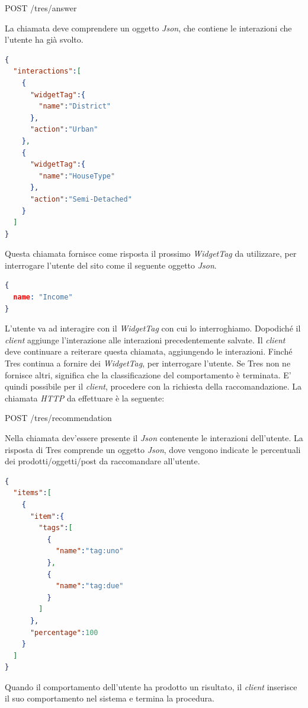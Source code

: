 \begin{center}
POST    /tres/answer
\end{center}
\newpage
La chiamata deve comprendere un oggetto \emph{Json}, che contiene le interazioni che l'utente ha già svolto.
\begin{lstlisting}[language=json,firstnumber=1]
{
  "interactions":[
    {
      "widgetTag":{
        "name":"District"
      },
      "action":"Urban"
    },
    {
      "widgetTag":{
        "name":"HouseType"
      },
      "action":"Semi-Detached"
    }  
  ]
}
\end{lstlisting}
Questa chiamata fornisce come risposta il prossimo \emph{WidgetTag} da utilizzare, per interrogare l'utente del sito come il seguente oggetto \emph{Json}.
\begin{lstlisting}[language=json,firstnumber=1]
{
  name: "Income"
}
\end{lstlisting}
L'utente va ad interagire con il \emph{WidgetTag} con cui lo interroghiamo. Dopodiché il \emph{client} aggiunge l'interazione alle interazioni precedentemente salvate. Il \emph{client} deve continuare a reiterare questa chiamata, aggiungendo le interazioni. Finché Tres continua a fornire dei \emph{WidgetTag}, per interrogare l'utente. Se Tres non ne fornisce altri, significa che la classificazione del comportamento è terminata. E' quindi possibile per il \emph{client}, procedere con la richiesta della raccomandazione. La chiamata \emph{HTTP} da effettuare è la seguente:
\begin{center}
POST    /tres/recommendation
\end{center}
Nella chiamata dev'essere presente il \emph{Json} contenente le interazioni dell'utente. La risposta di Tres comprende un oggetto \emph{Json}, dove vengono indicate le percentuali dei prodotti/oggetti/post da raccomandare all'utente.
\begin{lstlisting}[language=json,firstnumber=1]
{
  "items":[
    {
      "item":{
        "tags":[
          {
            "name":"tag:uno"
          },
          {
            "name":"tag:due"
          }
        ]
      },
      "percentage":100
    }
  ]
}
\end{lstlisting}
Quando il comportamento dell'utente ha prodotto un risultato, il \emph{client} inserisce il suo comportamento nel sistema e termina la procedura.
